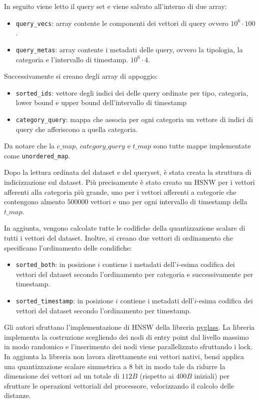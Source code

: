 In seguito viene letto il query set e viene salvato all'interno di due array:
\begin{itemize}
    \item \texttt{query\_vecs}: array contente le componenti dei vettori di query ovvero 
    $10^6 \cdot 100$.
    \item \texttt{query\_metas}: array contente i metadati delle query, ovvero la tipologia,
    la categoria e l'intervallo di timestamp.
    $10^6 \cdot 4$.
\end{itemize}

Successivamente si creano degli array di appoggio:
\begin{itemize}
    \item \texttt{sorted\_ids}: vettore degli indici dei delle query ordinate per tipo, 
    categoria, lower bound e upper bound dell'intervallo di timestamp
    \item \texttt{category\_query}: mappa che associa per ogni categoria un vettore di 
    indici di query che afferiscono a quella categoria.
\end{itemize}

Da notare che la $c\_map$, $category\_query$ e $t\_map$ sono tutte mappe implementate 
come \texttt{unordered\_map}.

Dopo la lettura ordinata del dataset e del queryset, è stata creata la struttura 
di indicizzazione sul dataset. Più precisamente è stato creato un HSNW per i vettori 
afferenti alla categoria più grande, uno per i vettori afferenti a categorie che 
contengono almento $500000$ vettori e uno per ogni intervallo di timestamp della 
$t\_map$. 

In aggiunta, vengono calcolate tutte le codifiche della quantizzazione scalare 
di tutti i vettori del dataset. Inoltre, si creano due vettori di ordinamento 
che specificano l'ordinamento delle condifiche:
\begin{itemize}
    \item \texttt{sorted\_both}: in posizione $i$ contiene i metadati dell'$i$-esima
    codifica dei vettori del dataset secondo l'ordinamento per categoria e successivamente
    per timestamp.
    \item \texttt{sorted\_timestamp}: in posizione $i$ contiene i metadati dell'$i$-esima
    codifica dei vettori del dataset secondo l'ordinamento per timestamp.
\end{itemize}

Gli autori sfruttano l'implementazione di HNSW della libreria 
\href{https://github.com/zilliztech/pyglass/tree/master}{pyglass}. 
La libreria implementa la costruzione scegliendo dei nodi di entry point dal livello 
massimo in modo randomico e l'inserimento dei nodi viene parallelizzato sfruttando 
i lock. In aggiunta la libreria non lavora direttamente sui vettori nativi, bensì
applica una quantizzazione scalare simmetrica a $8$ bit in modo tale da ridurre la dimensione 
dei vettori ad un totale di $112 B$ (rispetto ai $400 B$ iniziali) per sfruttare le operazioni vettoriali 
del processore, velocizzando il calcolo delle distanze.

